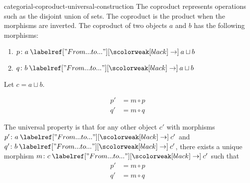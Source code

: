 \documentclass[preview]{standalone}
\begin{document}
\begin{snippet}{categorial-coproduct-universal-construction}
The coproduct represents operations
such as the disjoint union of sets.
The coproduct is the product when the morphisms are inverted.
The coproduct of two objects \(a\) and \(b\) has the following
morphisms:
\begin{enumerate}
    \item \(p \colon a \fromto a\sqcup b\)
    \item \(q \colon b \fromto a\sqcup b\)
\end{enumerate}

Let \(c=a\sqcup b\).

\begin{minipage}{0.5\textwidth}
\end{minipage}
\begin{minipage}{0.5\textwidth}
    \begin{align*}
        p' &= m \circ p \\
        q' &= m \circ q
    \end{align*}
\end{minipage}

The universal property is that for any other object \(c'\)
with morphisms \(p' \colon a \fromto c'\) and \(q' \colon b \fromto c'\),
there exists a unique morphism \(m \colon c \fromto c'\)
such that
\begin{align*}
    p' &= m \circ p \\
    q' &= m \circ q
\end{align*}
\end{snippet}
\end{document}
